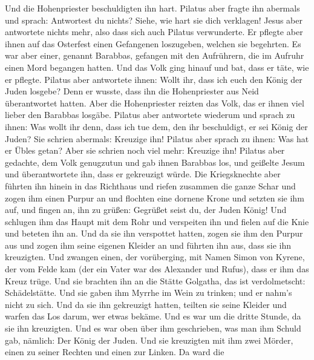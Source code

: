 Und die Hohenpriester beschuldigten ihn hart.  Pilatus aber
fragte ihn abermals und sprach: Antwortest du nichts? Siehe, wie hart
sie dich verklagen!  Jesus aber antwortete nichts mehr, also
dass sich auch Pilatus verwunderte.  Er pflegte aber ihnen
auf das Osterfest einen Gefangenen loszugeben, welchen sie begehrten.
 Es war aber einer, genannt Barabbas, gefangen mit den
Aufrührern, die im Aufruhr einen Mord begangen hatten.  Und
das Volk ging hinauf und bat, dass er täte, wie er pflegte. 
Pilatus aber antwortete ihnen: Wollt ihr, dass ich euch den König der
Juden losgebe?  Denn er wusste, dass ihn die Hohenpriester
aus Neid überantwortet hatten.  Aber die Hohenpriester
reizten das Volk, das er ihnen viel lieber den Barabbas losgäbe.
 Pilatus aber antwortete wiederum und sprach zu ihnen: Was
wollt ihr denn, dass ich tue dem, den ihr beschuldigt, er sei König der
Juden?  Sie schrien abermals: Kreuzige ihn! 
Pilatus aber sprach zu ihnen: Was hat er Übles getan? Aber sie schrien
noch viel mehr: Kreuzige ihn!  Pilatus aber gedachte, dem
Volk genugzutun und gab ihnen Barabbas los, und geißelte Jesum und
überantwortete ihn, dass er gekreuzigt würde.  Die
Kriegsknechte aber führten ihn hinein in das Richthaus und riefen
zusammen die ganze Schar  und zogen ihm einen Purpur an und
flochten eine dornene Krone und setzten sie ihm auf,  und
fingen an, ihn zu grüßen: Gegrüßet seist du, der Juden König!
 Und schlugen ihm das Haupt mit dem Rohr und verspeiten ihn
und fielen auf die Knie und beteten ihn an.  Und da sie ihn
verspottet hatten, zogen sie ihm den Purpur aus und zogen ihm seine
eigenen Kleider an und führten ihn aus, dass sie ihn kreuzigten.
 Und zwangen einen, der vorüberging, mit Namen Simon von
Kyrene, der vom Felde kam (der ein Vater war des Alexander und Rufus),
dass er ihm das Kreuz trüge.  Und sie brachten ihn an die
Stätte Golgatha, das ist verdolmetscht: Schädelstätte.  Und
sie gaben ihm Myrrhe im Wein zu trinken; und er nahm's nicht zu sich.
 Und da sie ihn gekreuzigt hatten, teilten sie seine
Kleider und warfen das Los darum, wer etwas bekäme.  Und es
war um die dritte Stunde, da sie ihn kreuzigten.  Und es
war oben über ihm geschrieben, was man ihm Schuld gab, nämlich: Der
König der Juden.  Und sie kreuzigten mit ihm zwei Mörder,
einen zu seiner Rechten und einen zur Linken.  Da ward die
